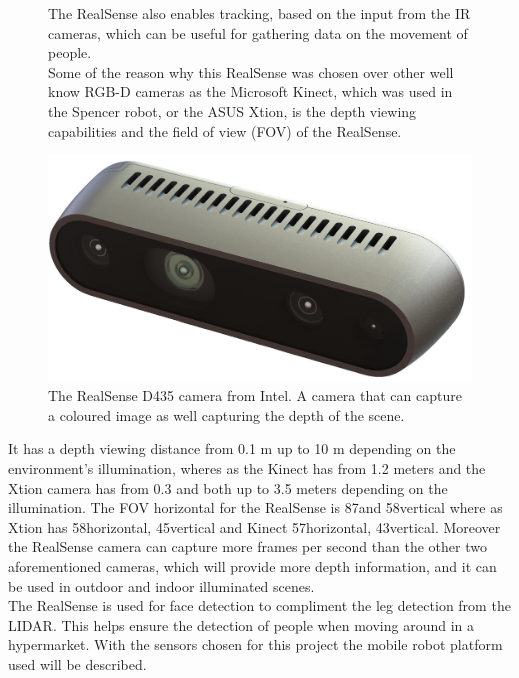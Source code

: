 \begin{figure}[H]
    \centering
    \begin{minipage}[b]{0.58\linewidth}
    The RealSense also enables tracking, based on the input from the IR cameras, which can be useful for gathering data on the movement of people.\cite{RealSense}\\
    Some of the reason why this RealSense was chosen over other well know RGB-D cameras as the Microsoft Kinect, which was used in the Spencer robot, or the ASUS Xtion, is the depth viewing capabilities and the field of view (FOV) of the RealSense. 
    \end{minipage}
    \hspace{0.2cm}
    \begin{minipage}[b]{0.39\linewidth}
    \centering
    \includegraphics[width=\textwidth]{figures/IntelRealsense.png}
    \caption{The RealSense D435 camera from Intel. A camera that can capture a coloured image as well capturing the depth of the scene.  }
    \label{fig:realsense}
    \end{minipage}
\end{figure}

It has a depth viewing distance from 0.1 m up to 10 m depending on the environment's illumination\cite{RealSense}, wheres as the Kinect has from 1.2 meters and the Xtion camera has from 0.3 and both up to 3.5 meters\cite{Xtion}\cite{Kinect} depending on the illumination. The FOV horizontal for the RealSense is 87\degree and 58\degree vertical where as Xtion has 58\degree horizontal, 45\degree vertical\cite{Xtion} and Kinect 57\degree horizontal, 43\degree vertical\cite{Kinect}. Moreover the RealSense camera can capture more frames per second than the other two aforementioned cameras, which will provide more depth information, and it can be used in outdoor and indoor illuminated scenes.\cite{RealSense} \\

The RealSense is used for face detection to compliment the leg detection from the LIDAR. This helps ensure the detection of people when moving around in a hypermarket. With the sensors chosen for this project the mobile robot platform used will be described.
